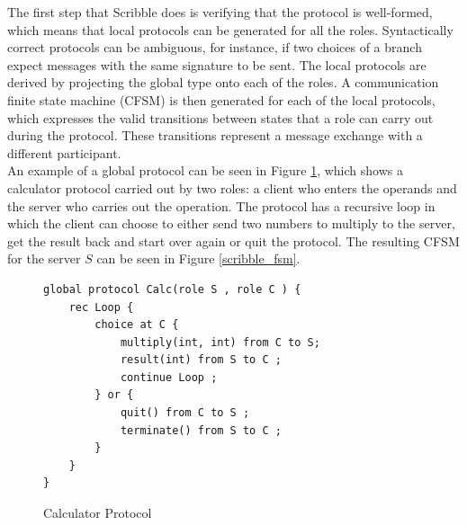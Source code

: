 \documentclass[12pt,twoside]{report}
\begin{document}
The first step that Scribble does is verifying that the protocol is well-formed, which means that local protocols can be generated for all the roles. Syntactically correct protocols can be ambiguous, for instance, if two choices of a branch expect messages with the same signature to be sent. The local protocols are derived by projecting the global type onto each of the roles. A communication finite state machine (CFSM) is then generated for each of the local protocols, which expresses the valid transitions between states that a role can carry out during the protocol. These transitions represent a message exchange with a different participant.\\

An example of a global protocol can be seen in Figure \ref{scribble_protocol}, which shows a calculator protocol carried out by two roles: a client who enters the operands and the server who carries out the operation. The protocol has a recursive loop in which the client can choose to either send two numbers to multiply to the server, get the result back and start over again or quit the protocol. The resulting CFSM for the server $S$ can be seen in Figure \ref{scribble_fsm}.\\

\begin{figure}
    \centering
    \lstset{language=Scribble}
    \begin{lstlisting}
global protocol Calc(role S , role C ) {
    rec Loop {
    	choice at C {
    		multiply(int, int) from C to S;
    		result(int) from S to C ;
    		continue Loop ;
    	} or {
    		quit() from C to S ;
    		terminate() from S to C ;
    	}
    }
}
    \end{lstlisting}
    \caption{Calculator Protocol}
    \label{scribble_protocol}
\end{figure}{}
\end{document}
